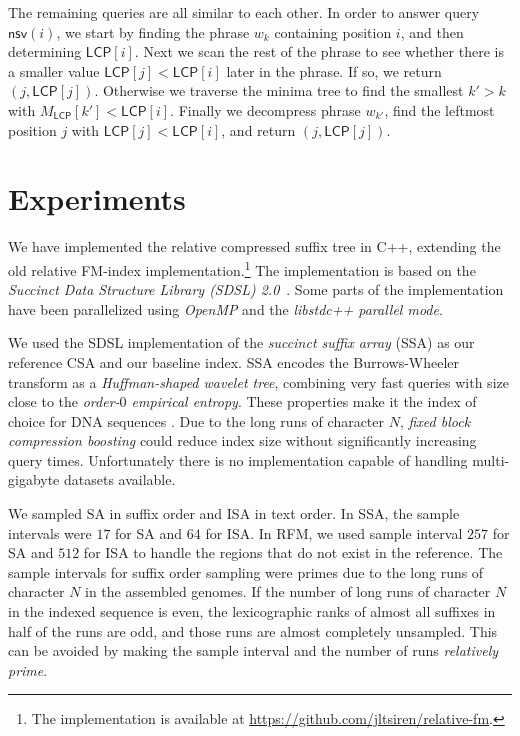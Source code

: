 \documentclass[a4paper,11pt]{llncs}
\newcommand{\SA}{\textsf{SA}}
\newcommand{\ISA}{\textsf{ISA}}
\newcommand{\CSA}{\textsf{CSA}}
\newcommand{\SSA}{\textsf{SSA}}
\newcommand{\RFM}{\textsf{RFM}}
\newcommand{\mLCP}{\ensuremath{\mathsf{LCP}}}
\newcommand{\mnsv}{\ensuremath{\mathsf{nsv}}}
\begin{document}
The remaining queries are all similar to each other. In order to answer query
$\mnsv(i)$, we start by finding the phrase $w_{k}$ containing position $i$,
and then determining $\mLCP[i]$. Next we scan the rest of the phrase to see
whether there is a smaller value $\mLCP[j] < \mLCP[i]$ later in the phrase. If
so, we return $(j,\mLCP[j])$. Otherwise we traverse the minima tree to find
the smallest $k' > k$ with $M_{\mLCP}[k'] < \mLCP[i]$. Finally we decompress
phrase $w_{k'}$, find the leftmost position $j$ with $\mLCP[j] < \mLCP[i]$,
and return $(j,\mLCP[j])$.


\section{Experiments}

We have implemented the relative compressed suffix tree in C++, extending the
old relative FM-index implementation.\footnote{The implementation is available
at \url{https://github.com/jltsiren/relative-fm}.} The implementation is based
on the \emph{Succinct Data Structure Library (SDSL) 2.0}~\cite{Gog2014b}. Some
parts of the implementation have been parallelized using \emph{OpenMP} and the
\emph{libstdc++ parallel mode}.

We used the SDSL implementation of the \emph{succinct suffix array} (\SSA{})
\cite{Ferragina2007a,Maekinen2005} as our reference \CSA{} and our baseline
index. \SSA{} encodes the Burrows-Wheeler transform as a \emph{Huffman-shaped
wavelet tree}, combining very fast queries with size close to the
\emph{order\nobreakdash-$0$ empirical entropy}. These properties make it the
index of choice for DNA sequences \cite{Ferragina2009a}. Due to the long runs
of character $N$, \emph{fixed block compression boosting}
\cite{Kaerkkaeinen2011} could reduce index size without significantly
increasing query times. Unfortunately there is no implementation capable of
handling multi-gigabyte datasets available.

We sampled \SA{} in suffix order and \ISA{} in text order. In \SSA, the sample
intervals were $17$ for \SA{} and $64$ for \ISA. In \RFM, we used sample
interval $257$ for \SA{} and $512$ for \ISA{} to handle the regions that do
not exist in the reference. The sample intervals for suffix order sampling
were primes due to the long runs of character $N$ in the assembled genomes. If
the number of long runs of character $N$ in the indexed sequence is even, the
lexicographic ranks of almost all suffixes in half of the runs are odd, and
those runs are almost completely unsampled. This can be avoided by making the
sample interval and the number of runs \emph{relatively prime}.
\end{document}
